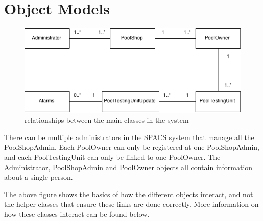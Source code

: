 \newcommand{\object}[3]{
\begin{tabular}[h!]{| p{7cm} |}
	\hline
	\begin{center}\textbf{#1}\end{center} \\ \hline
	\begin{mylist} #2 \end{mylist} \\ \hline
	\begin{mylist} #3 \end{mylist} \\ \hline

\end{tabular}
}

\newenvironment{mylist}{
	\begin{enumerate}[label=+]
}{
	\end{enumerate}
}

\section{Object Models}

\begin{figure}[h!]
\begin{center}
	\includegraphics[width=15cm]{images/ObjectRelations}
	\caption{relationships between the main classes in the system}
\end{center}
\end{figure}

\par
There can be multiple administrators in the SPACS system that manage all the PoolShopAdmin. Each PoolOwner can only be registered at one PoolShopAdmin, and each PoolTestingUnit can only be linked to one PoolOwner. The Administrator, PoolShopAdmin and PoolOwner objects all contain information about a single person.
\par
The above figure shows the basics of how the different objects interact, and not the helper classes that ensure these links are done correctly. More information on how these classes interact can be found below.

